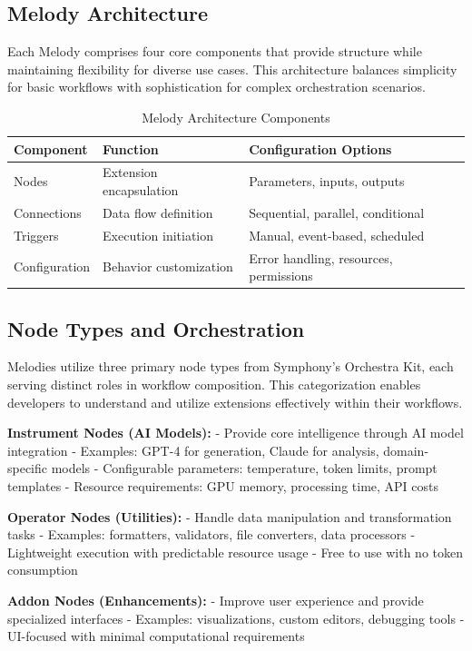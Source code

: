 \subsection*{Melody Architecture}

Each Melody comprises four core components that provide structure while maintaining flexibility for diverse use cases. This architecture balances simplicity for basic workflows with sophistication for complex orchestration scenarios.

\begin{table}[ht]
\centering
\begin{tabular}{@{}lll@{}}
\toprule
\textbf{Component} & \textbf{Function} & \textbf{Configuration Options} \\
\midrule
Nodes & Extension encapsulation & Parameters, inputs, outputs \\
Connections & Data flow definition & Sequential, parallel, conditional \\
Triggers & Execution initiation & Manual, event-based, scheduled \\
Configuration & Behavior customization & Error handling, resources, permissions \\
\bottomrule
\end{tabular}
\caption{Melody Architecture Components}
\end{table}

\subsection*{Node Types and Orchestration}

Melodies utilize three primary node types from Symphony's Orchestra Kit, each serving distinct roles in workflow composition. This categorization enables developers to understand and utilize extensions effectively within their workflows.

\textbf{Instrument Nodes (AI Models):}
- Provide core intelligence through AI model integration
- Examples: GPT-4 for generation, Claude for analysis, domain-specific models
- Configurable parameters: temperature, token limits, prompt templates
- Resource requirements: GPU memory, processing time, API costs

\textbf{Operator Nodes (Utilities):}
- Handle data manipulation and transformation tasks
- Examples: formatters, validators, file converters, data processors
- Lightweight execution with predictable resource usage
- Free to use with no token consumption

\textbf{Addon Nodes (Enhancements):}
- Improve user experience and provide specialized interfaces
- Examples: visualizations, custom editors, debugging tools
- UI-focused with minimal computational requirements

